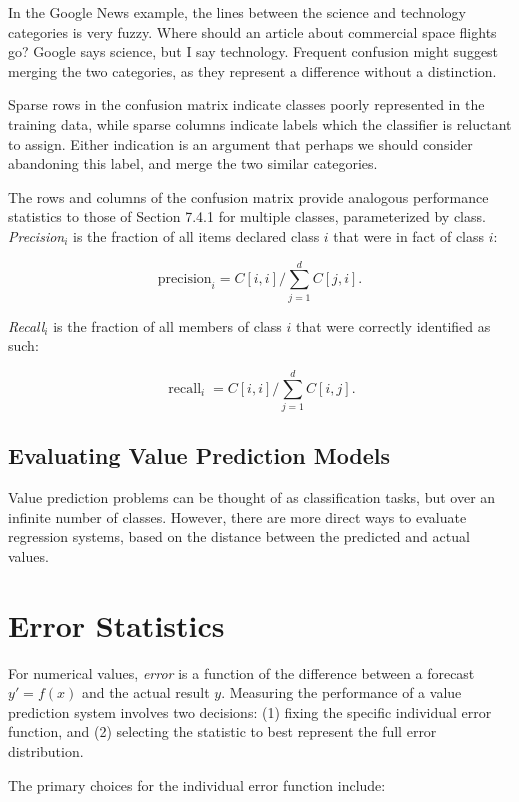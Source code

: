 \documentclass[10pt]{article}
\begin{document}
In the Google News example, the lines between the science and technology categories is very fuzzy. Where should an article about commercial space flights go? Google says science, but I say technology. Frequent confusion might suggest merging the two categories, as they represent a difference without a distinction.

Sparse rows in the confusion matrix indicate classes poorly represented in the training data, while sparse columns indicate labels which the classifier is reluctant to assign. Either indication is an argument that perhaps we should consider abandoning this label, and merge the two similar categories.

The rows and columns of the confusion matrix provide analogous performance statistics to those of Section 7.4.1 for multiple classes, parameterized by class. \textit{Precision}$_{i}$ is the fraction of all items declared class \(i\) that were in fact of class \(i\):

\[
\text{precision}_{i} = C[i, i] / \sum_{j=1}^{d} C[j, i].
\]

\textit{Recall}$_{i}$ is the fraction of all members of class \(i\) that were correctly identified as such:

\[
\operatorname{recall}_{i} = C[i, i] / \sum_{j=1}^{d} C[i, j].
\]

\subsection{Evaluating Value Prediction Models}
Value prediction problems can be thought of as classification tasks, but over an infinite number of classes. However, there are more direct ways to evaluate regression systems, based on the distance between the predicted and actual values.

\section*{Error Statistics}
For numerical values, \textit{error} is a function of the difference between a forecast \(y' = f(x)\) and the actual result \(y\). Measuring the performance of a value prediction system involves two decisions: (1) fixing the specific individual error function, and (2) selecting the statistic to best represent the full error distribution.

The primary choices for the individual error function include:
\end{document}
